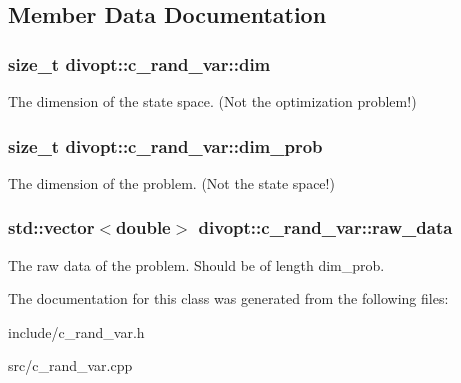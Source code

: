 \subsection{\-Member \-Data \-Documentation}
\hypertarget{classdivopt_1_1c__rand__var_ad263b31b0e272d1c00a7368362ed19e4}{
\subsubsection[{dim}]{\setlength{\rightskip}{0pt plus 5cm}size\-\_\-t {\bf divopt\-::c\-\_\-rand\-\_\-var\-::dim}}}\label{classdivopt_1_1c__rand__var_ad263b31b0e272d1c00a7368362ed19e4}
\-The dimension of the state space. (\-Not the optimization problem!) \hypertarget{classdivopt_1_1c__rand__var_accebcd3c62fcf1958e6d21b82bd0d4ae}{
\subsubsection[{dim\-\_\-prob}]{\setlength{\rightskip}{0pt plus 5cm}size\-\_\-t {\bf divopt\-::c\-\_\-rand\-\_\-var\-::dim\-\_\-prob}}}\label{classdivopt_1_1c__rand__var_accebcd3c62fcf1958e6d21b82bd0d4ae}
\-The dimension of the problem. (\-Not the state space!) \hypertarget{classdivopt_1_1c__rand__var_a5817d4b94c53e6e6a7f8d4027cbce4e1}{
\subsubsection[{raw\-\_\-data}]{\setlength{\rightskip}{0pt plus 5cm}std\-::vector$<$double$>$ {\bf divopt\-::c\-\_\-rand\-\_\-var\-::raw\-\_\-data}}}\label{classdivopt_1_1c__rand__var_a5817d4b94c53e6e6a7f8d4027cbce4e1}
\-The raw data of the problem. \-Should be of length dim\-\_\-prob. 

\-The documentation for this class was generated from the following files\-:\begin{DoxyCompactItemize}
\item 
include/c\-\_\-rand\-\_\-var.\-h\item 
src/c\-\_\-rand\-\_\-var.\-cpp\end{DoxyCompactItemize}
